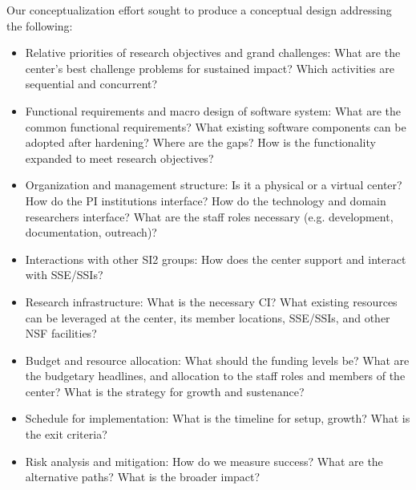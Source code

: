 Our conceptualization effort sought to produce a conceptual design addressing the following:
\begin{itemize}
\item Relative priorities of research objectives and grand challenges: What are the center's best
challenge problems for sustained impact? Which activities are sequential and concurrent?
\item Functional requirements and macro design of software system: What are the common
functional requirements? What existing software components can be adopted after hardening?
Where are the gaps? How is the functionality expanded to meet research objectives?
\item Organization and management structure: Is it a physical or a virtual center? How do the PI
institutions interface? How do the technology and domain researchers interface? What are
the staff roles necessary (e.g. development, documentation, outreach)?
\item Interactions with other SI2 groups: How does the center support and interact with SSE/SSIs?
\item Research infrastructure: What is the necessary CI? What existing resources can be leveraged
at the center, its member locations, SSE/SSIs, and other NSF facilities?
\item Budget and resource allocation: What should the funding levels be? What are the budgetary
headlines, and allocation to the staff roles and members of the center? What is the strategy
for growth and sustenance?
\item Schedule for implementation: What is the timeline for setup, growth? What is the exit criteria?
\item Risk analysis and mitigation: How do we measure success? What are the alternative paths?
What is the broader impact?
\end{itemize}
